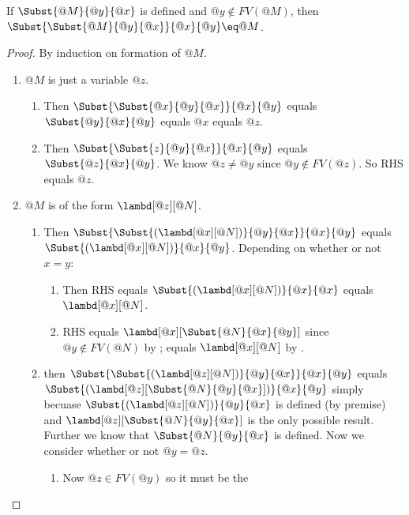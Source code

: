 \documentclass[../../../include/open-logic-section]{subfiles}
\begin{document}
\begin{thm}
  If $\Subst{@M}{@y}{@x}$ is defined and $@y \notin FV(@M)$, then $\Subst{\Subst{@M}{@y}{@x}}{@x}{@y} \eq @M$.
\end{thm}
\begin{proof}
  By induction on formation of $@M$.
  \begin{enumerate}
    \item[\rule{VAR}] $@M$ is just a variable $@z$.
      \begin{enumerate}
        \item[$@z \eq @x$] Then $\Subst{\Subst{@x}{@y}{@x}}{@x}{@y}$
          equals $\Subst{@y}{@x}{@y}$ equals $@x$ equals $@z$.
        \item[$@z \neq @x$] Then $\Subst{\Subst{z}{@y}{@x}}{@x}{@y}$
          equals $\Subst{@z}{@x}{@y}$. We know $@z \neq @y$ since $@y
          \notin FV(@z)$. So RHS equals $@z$.
      \end{enumerate}
    \item[\rule{ABS}] $@M$ is of the form $\lambd[@z][@N]$.
      \begin{enumerate}
        \item[$@z \eq @x$] Then $\Subst{\Subst{(\lambd[@x][@N])}{@y}{@x}}{@x}{@y}$
          equals $\Subst{(\lambd[@x][@N])}{@x}{@y}$. Depending on
          whether or not $x=y$:
          \begin{enumerate}
            \item[$@x = @y$] Then RHS equals
              $\Subst{(\lambd[@x][@N])}{@x}{@x}$ equals $\lambd[@x][@N]$.
            \item[$@x \neq @y$] 
              RHS equals $\lambd[@x][\Subst{@N}{@x}{@y}]$ since $@y
              \notin FV(@N)$ by ; equals
              $\lambd[@x][@N]$ by .
          \end{enumerate}
        \item[$@z \neq @x$] then $\Subst{\Subst{(\lambd[@z][@N])}{@y}{@x}}{@x}{@y}$ equals 
          $\Subst{(\lambd[@z][\Subst{@N}{@y}{@x}])}{@x}{@y}$ 
          simply becuase $\Subst{(\lambd[@z][@N])}{@y}{@x}$ is
          defined (by premise) and 
            $\lambd[@z][\Subst{@N}{@y}{@x}]$ is the only possible result.
            Further we know that $\Subst{@N}{@y}{@x}$ is defined. Now
            we consider whether or not $@y = @z$.
            \begin{enumerate}
              \item[$@y = @z$] Now $@z \in FV(@y)$ so it must be the

\end{enumerate}
\end{enumerate}
\end{enumerate}
\end{proof}
\end{document}
